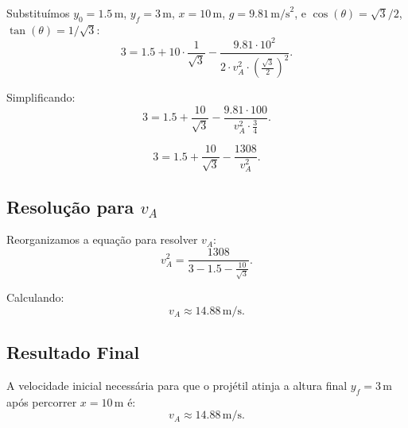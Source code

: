 Substituímos \(y_0 = 1.5 \, \text{m}\), \(y_f = 3 \, \text{m}\), \(x = 10 \, \text{m}\), \(g = 9.81 \, \text{m/s}^2\), e \(\cos(\theta) = \sqrt{3}/2\), \(\tan(\theta) = 1/\sqrt{3}\):
\[
3 = 1.5 + 10 \cdot \frac{1}{\sqrt{3}} - \frac{9.81 \cdot 10^2}{2 \cdot v_A^2 \cdot \left(\frac{\sqrt{3}}{2}\right)^2}.
\]

Simplificando:
\[
3 = 1.5 + \frac{10}{\sqrt{3}} - \frac{9.81 \cdot 100}{v_A^2 \cdot \frac{3}{4}}.
\]

\[
3 = 1.5 + \frac{10}{\sqrt{3}} - \frac{1308}{v_A^2}.
\]

\subsection*{Resolução para \(v_A\)}
Reorganizamos a equação para resolver \(v_A\):
\[
v_A^2 = \frac{1308}{3 - 1.5 - \frac{10}{\sqrt{3}}}.
\]

Calculando:
\[
v_A \approx 14.88 \, \text{m/s}.
\]

\subsection*{Resultado Final}
A velocidade inicial necessária para que o projétil atinja a altura final \(y_f = 3 \, \text{m}\) após percorrer \(x = 10 \, \text{m}\) é:
\[
v_A \approx 14.88 \, \text{m/s}.
\]
